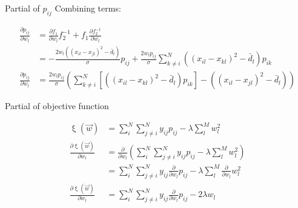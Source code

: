 \documentclass[12pt, a4paper]{article}
\begin{document}
\begin{section}{Partial of $p_{ij}$}
    Combining terms:

    \begin{align*}
        \frac{\partial p_{ij}}{\partial w_l}
        &= 
            \frac{\partial f_1}{\partial w_l} f_2^{-1} +
            f_1 \frac{\partial f_2^{-1}}{\partial w_l} \\
        &= 
        - \frac{ 2w_l\left ( (x_{il} - x_{jl})^2 - \bar d_l \right )}{\sigma}
        p_{ij} + \frac{2w_l p_{ij}}{\sigma} \sum \limits_{k \neq i}^N
        \left ( (x_{il} - x_{kl})^2 - \bar d_l \right ) p_{ik} \\
        \frac{\partial p_{ij}}{\partial w_l}
        &= \frac{2 w_l p_{ij}}{\sigma} 
            \left (
                \sum \limits_{k \neq i}^N
                \left [ \left ( (x_{il} - x_{kl})^2 - \bar d_l \right ) p_{ik}
                \right ] -
                \left ( (x_{il} - x_{jl})^2 - \bar d_l \right )
            \right )
    \end{align*}
\end{section}

\begin{section}{Partial of objective function}

    \begin{align*}
        \upxi(\vec w) &= \sum \limits_i^N \sum \limits_{j \neq i}^N y_{ij} p_{ij}
        - \lambda \sum \limits_l^M w_l^2 \\
        \frac{\partial \upxi(\vec w)}{\partial w_l} &=
            \frac{\partial}{\partial w_l} \left ( 
                \sum \limits_i^N \sum \limits_{j \neq i}^N y_{ij} p_{ij}
                - \lambda \sum \limits_l^M w_l^2 \right ) \\
        &=
            \sum \limits_i^N \sum \limits_{j \neq i}^N y_{ij}
                \frac{\partial}{\partial w_l}  p_{ij}
            - \lambda \sum \limits_l^M \frac{\partial}{\partial w_l} w_l^2 \\
        \frac{\partial \upxi(\vec w)}{\partial w_l}
        &=
            \sum \limits_i^N \sum \limits_{j \neq i}^N y_{ij}
            \frac{\partial}{\partial w_l}  p_{ij} - 2 \lambda w_l \\
    \end{align*}
\end{section}
\end{document}
